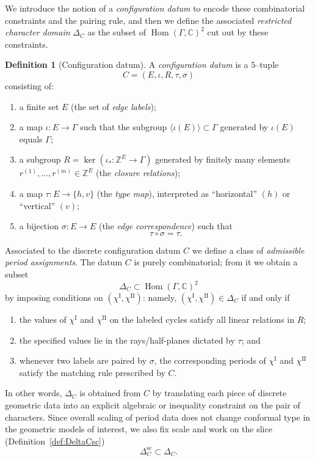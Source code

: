 \documentclass[a4paper,12pt]{amsart}
\newcommand{\C}{\mathbb{C}}
\newcommand{\Z}{\mathbb{Z}}
\newcommand{\Hom}{\operatorname{Hom}}
\theoremstyle{plain}
\theoremstyle{definition}
\newtheorem{definition}[theorem]{Definition}
\begin{document}
We introduce the notion of a \emph{configuration datum} to encode these combinatorial constraints and the pairing rule, and then we define the associated \emph{restricted character domain} $\Delta_C$ as the subset of $\Hom(\Gamma,\C)^2$ cut out by these constraints.

\begin{definition}[Configuration datum]\label{def:config}
A \emph{configuration datum} is a $5$--tuple
\[
C=(E,\iota,R,\tau,\sigma)
\]
consisting of:
\begin{enumerate}
\item a finite set $E$ (the set of \emph{edge labels});
\item a map $\iota:E\longrightarrow\Gamma$ such that the subgroup $\langle\iota(E)\rangle\subset\Gamma$ generated by $\iota(E)$
equals $\Gamma$;
\item a subgroup $R=\ker(\iota_*:\Z^E\longrightarrow\Gamma)$ generated by finitely many elements
$r^{(1)},\dots,r^{(m)}\in\Z^E$ (the \emph{closure relations});
\item a map $\tau:E\longrightarrow\{h,v\}$ (the \emph{type map}), interpreted as ``horizontal'' $(h)$ or ``vertical'' $(v)$;
\item a bijection $\sigma:E\longrightarrow E$ (the \emph{edge correspondence}) such that
\[
\tau\circ\sigma=\tau .
\]
\end{enumerate}
\end{definition}

Associated to the discrete configuration datum \(C\) we define a class of \emph{admissible period assignments}. The datum \(C\) is purely combinatorial; from it we obtain a subset
\[
\Delta_C \subset \Hom(\Gamma,\C)^2
\] by imposing conditions on \((\chi^{\mathrm{I}},\chi^{\mathrm{II}})\): namely,
\((\chi^{\mathrm{I}},\chi^{\mathrm{II}})\in\Delta_C\) if and only if
\begin{enumerate}[itemsep=2pt, topsep=2pt]
\item the values of \(\chi^{\mathrm{I}}\) and \(\chi^{\mathrm{II}}\) on the labeled cycles satisfy all linear
relations in \(R\);
\item the specified values lie in the rays/half-planes dictated by \(\tau\); and
\item whenever two labels are paired by \(\sigma\), the corresponding periods of \(\chi^{\mathrm{I}}\) and
\(\chi^{\mathrm{II}}\) satisfy the matching rule prescribed by \(C\).
\end{enumerate}
In other words, \(\Delta_C\) is obtained from \(C\) by translating each piece of discrete geometric data into
an explicit algebraic or inequality constraint on the pair of characters.
Since overall scaling of period data does not change conformal type in the geometric models of interest,
we also fix scale and work on the slice (Definition~\ref{def:DeltaCsc})
\[
\Delta_C^{\mathrm{sc}}\subset \Delta_C.
\]
\end{document}
